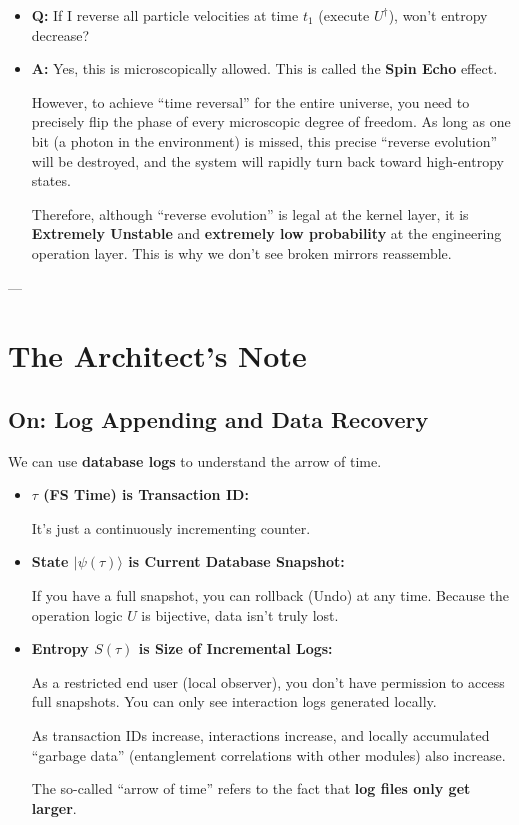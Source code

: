\begin{itemize}
\item \textbf{Q:} If I reverse all particle velocities at time $t_1$ (execute $U^\dagger$), won't entropy decrease?

\item \textbf{A:} Yes, this is microscopically allowed. This is called the \textbf{Spin Echo} effect.

    However, to achieve ``time reversal'' for the entire universe, you need to precisely flip the phase of every microscopic degree of freedom. As long as one bit (a photon in the environment) is missed, this precise ``reverse evolution'' will be destroyed, and the system will rapidly turn back toward high-entropy states.

    Therefore, although ``reverse evolution'' is legal at the kernel layer, it is \textbf{Extremely Unstable} and \textbf{extremely low probability} at the engineering operation layer. This is why we don't see broken mirrors reassemble.
\end{itemize}

---

\section{The Architect's Note}

\subsection{On: Log Appending and Data Recovery}

We can use \textbf{database logs} to understand the arrow of time.

\begin{itemize}
\item \textbf{$\tau$ (FS Time) is Transaction ID:}

    It's just a continuously incrementing counter.

\item \textbf{State $|\psi(\tau)\rangle$ is Current Database Snapshot:}

    If you have a full snapshot, you can rollback (Undo) at any time. Because the operation logic $U$ is bijective, data isn't truly lost.

\item \textbf{Entropy $S(\tau)$ is Size of Incremental Logs:}

    As a restricted end user (local observer), you don't have permission to access full snapshots. You can only see interaction logs generated locally.

    As transaction IDs increase, interactions increase, and locally accumulated ``garbage data'' (entanglement correlations with other modules) also increase.

    The so-called ``arrow of time'' refers to the fact that \textbf{log files only get larger}.
\end{itemize}

